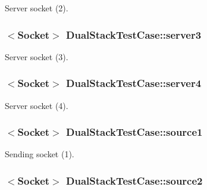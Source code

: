 Server socket (2). 

\subsubsection[{\texorpdfstring{server3}{server3}}]{$<${\bf Socket}$>$ Dual\+Stack\+Test\+Case\+::server3\hspace{0.3cm}{\ttfamily [private]}}\hypertarget{classDualStackTestCase_a35f3bc681d2fc1f54a5a5e7c5530c2da}{}\label{classDualStackTestCase_a35f3bc681d2fc1f54a5a5e7c5530c2da}


Server socket (3). 

\subsubsection[{\texorpdfstring{server4}{server4}}]{$<${\bf Socket}$>$ Dual\+Stack\+Test\+Case\+::server4\hspace{0.3cm}{\ttfamily [private]}}\hypertarget{classDualStackTestCase_a151f957a3f71c91cda6ea65e11e5499e}{}\label{classDualStackTestCase_a151f957a3f71c91cda6ea65e11e5499e}


Server socket (4). 

\subsubsection[{\texorpdfstring{source1}{source1}}]{$<${\bf Socket}$>$ Dual\+Stack\+Test\+Case\+::source1\hspace{0.3cm}{\ttfamily [private]}}\hypertarget{classDualStackTestCase_a54b138b91c944a0b15ab29b952b93a4b}{}\label{classDualStackTestCase_a54b138b91c944a0b15ab29b952b93a4b}


Sending socket (1). 

\subsubsection[{\texorpdfstring{source2}{source2}}]{$<${\bf Socket}$>$ Dual\+Stack\+Test\+Case\+::source2\hspace{0.3cm}{\ttfamily [private]}}\hypertarget{classDualStackTestCase_a61fd1d32c28557623bf74535044693bb}{}\label{classDualStackTestCase_a61fd1d32c28557623bf74535044693bb}


